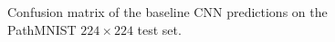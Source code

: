 \begin{figure}[htbp]
    \centering
    
    \caption{Confusion matrix of the baseline CNN predictions on the PathMNIST
    $224 \times 224$ test set.}
    \label{fig:baseline224-confusion-matrix}
\end{figure}
